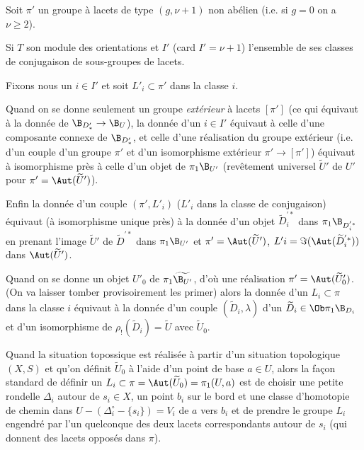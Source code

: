 \section*{}

Soit $\pi'$ un groupe à lacets de type $(g, \nu + 1)$ non abélien (i.e. si $g = 0$ on a $\nu \geq 2$).

Si $T$ son module des orientations et $I'$ (card $I' = \nu + 1$) l'ensemble de ses classes de conjugaison de sous-groupes de lacets.

Fixons nous un $i \in I'$ et soit $L'_i \subset  \pi'$ dans la classe $i$.

Quand on se donne seulement un groupe \emph{extérieur} à lacets $[\pi']$ (ce qui équivaut à la donnée de $\B_{D'_*} \to \B_U$), la donnée d'un $i \in I'$ équivaut à celle d'une composante connexe de $\B_{D'_*}$, et celle d'une réalisation du groupe extérieur (i.e. d'un couple d'un groupe $\pi'$ et d'un isomorphisme extérieur $\pi' \to [\pi']$) équivaut à isomorphisme près à celle d'un objet de $\pi_1 \B_{U'}$ (revêtement universel $\widetilde{U}'$ de $U'$ pour $\pi' = \Aut(\widetilde{U}')$).

Enfin la donnée d'un couple $(\pi', L'_i)$ ($L'_i$ dans la classe de conjugaison) équivaut (à isomorphisme unique près) à la donnée d'un objet $\widetilde{D}^{'*}_i$ dans $\pi_1 \B_{D^{'*}_i}$ en prenant l'image $\widetilde{U}'$ de $\widetilde{D}^{'*}$ dans $\pi_1 \B_{U'}$ et $\pi' = \Aut (\widetilde{U}')$, $L'i = \Im (\Aut(\widetilde{D}^{'*}_i))$ dans $\Aut(\widetilde{U}')$.

Quand on se donne un objet $U'_0$ de $\pi_1 \widetilde{\B_{U'}}$, d'où une réalisation $\pi' = \Aut (\widetilde{U}'_0)$. (On va laisser tomber provisoirement les primer) alors la donnée d'un $L_i \subset  \pi$ dans la classe $i$ équivaut à la donnée d'un couple $(\widetilde{D}_i, \lambda)$ d'un $\widetilde{D}_i \in \Ob \pi_1 \B_{D_i}$ et d'un isomorphisme de $\rho_! (\widetilde{D}_i) = \widetilde{U}$ avec $\widetilde{U}_0$.

Quand la situation topossique est réalisée à partir d'un situation topologique $(X, S)$ et qu'on définit $\widetilde{U}_0$ à l'aide d'un point de base $a \in U$, alors la fa\c{c}on standard de définir un $L_i \subset  \pi = \Aut (\widetilde{U}_0) = \pi_1(U, a)$ est de choisir une petite rondelle $\Delta_i$ autour de $s_i \in X$, un point $b_i$ sur le bord et une classe d'homotopie de chemin dans $U - (\Delta^\circ_i - \{ s_i \}) = V_i$ de $a$ vers $b_i$ et de prendre le groupe $L_i$ engendré par l'un quelconque des deux lacets correspondants autour de $s_i$ (qui donnent des lacets opposés dans $\pi$).

